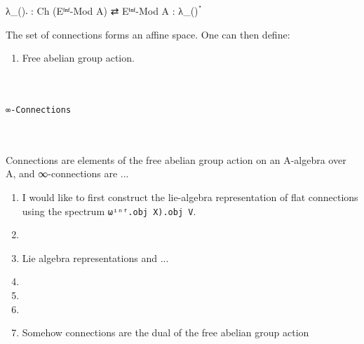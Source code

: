 \documentclass{book}
\theoremstyle{definition}
\renewcommand{\chapter}[1]{
\newpage
{
\Huge 
\begin{center}
\ \\
\ \\
\thispagestyle{empty}
\texttt{#1}
\end{center}}
\ \\
\ \\
}
\begin{document}
\begin{center}
λ\_()𛲔 : Ch (Eⁱⁿᶠ-Mod A) ⇄ Eⁱⁿᶠ-Mod A : λ\_()ॱ
\end{center}
\fi

The set of connections forms an affine space. One can then define:

\begin{enumerate}
\item Free abelian group action.
\end{enumerate}

\newpage
\chapter{∞-Connections}

Connections are elements of the free abelian group action on an A-algebra over A, and ∞-connections are ...\\

\begin{enumerate}
\item I would like to first construct the lie-algebra representation of flat connections using the spectrum \texttt{ωⁱⁿᶠ.obj X).obj V}.
\item 
\item Lie algebra representations and ...
\item 
\item 
\item 
\item Somehow connections are the dual of the free abelian group action
\end{enumerate}

\end{document}
